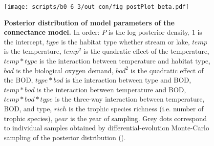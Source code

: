 \documentclass[11pt, oneside]{article}
\begin{document}
\begin{figure}[H]
\begin{center}
\texttt{[image: scripts/b0\_6\_3/out\_con/fig\_postPlot\_beta.pdf]}
\caption{
    \textbf{Posterior distribution of model parameters of the connectance model.}
    In order: $P$ is the log posterior density, $1$ is the intercept, $type$ is the habitat type whether stream or lake, $temp$ is the temperature, $temp^2$ is the quadratic effect of the temperature, $temp * type$ is the interaction between temperature and habitat type, $bod$ is the biological oxygen demand, $bod^2$ is the quadratic effect of the BOD, $type * bod$ is the interaction between type and BOD, $temp * bod$ is the interaction between temperature and BOD, $temp * bod * type$ is the three-way interaction between temperature, BOD, and type, $rich$ is the trophic species richness (i.e. number of trophic species), $year$ is the year of sampling.
    Grey dots correspond to individual samples obtained by differential-evolution Monte-Carlo sampling of the posterior distribution (\cite{TerBraak2006}). 
} 
\end{center}
\end{figure}
\end{document}
